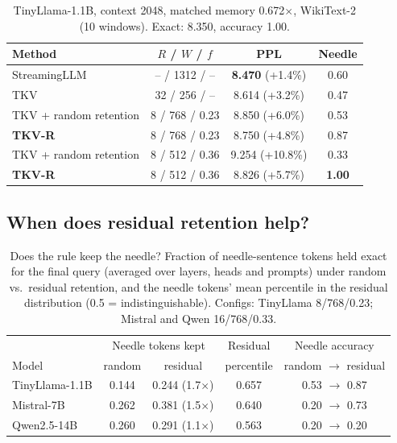 \documentclass{article}
\begin{document}
\begin{table}[t]
\centering
\caption{TinyLlama-1.1B, context 2048, matched memory 0.672$\times$,
WikiText-2 (10 windows). Exact: 8.350, accuracy 1.00.}
\label{tab:tiny}
\small
\begin{tabular}{lccc}
\toprule
Method & $R$ / $W$ / $f$ & PPL & Needle \\
\midrule
StreamingLLM & -- / 1312 / -- & \textbf{8.470} (+1.4\%) & 0.60 \\
TKV & 32 / 256 / -- & 8.614 (+3.2\%) & 0.47 \\
TKV + random retention & 8 / 768 / 0.23 & 8.850 (+6.0\%) & 0.53 \\
\textbf{TKV-R} & 8 / 768 / 0.23 & 8.750 (+4.8\%) & 0.87 \\
TKV + random retention & 8 / 512 / 0.36 & 9.254 (+10.8\%) & 0.33 \\
\textbf{TKV-R} & 8 / 512 / 0.36 & 8.826 (+5.7\%) & \textbf{1.00} \\
\bottomrule
\end{tabular}
\end{table}

\subsection{When does residual retention help?}
\label{sec:diag}

\begin{table}[t]
\centering
\caption{Does the rule keep the needle? Fraction of needle-sentence tokens held
exact for the final query (averaged over layers, heads and prompts) under
random vs.\ residual retention, and the needle tokens' mean percentile in the
residual distribution (0.5 = indistinguishable). Configs: TinyLlama
8/768/0.23; Mistral and Qwen 16/768/0.33.}
\label{tab:diag}
\small
\begin{tabular}{lcccc}
\toprule
& \multicolumn{2}{c}{Needle tokens kept} & Residual & Needle accuracy \\
Model & random & residual & percentile & random $\to$ residual \\
\midrule
TinyLlama-1.1B & 0.144 & 0.244 (1.7$\times$) & 0.657 & 0.53 $\to$ 0.87 \\
Mistral-7B     & 0.262 & 0.381 (1.5$\times$) & 0.640 & 0.20 $\to$ 0.73 \\
Qwen2.5-14B    & 0.260 & 0.291 (1.1$\times$) & 0.563 & 0.20 $\to$ 0.20 \\
\bottomrule
\end{tabular}
\end{table}
\end{document}

